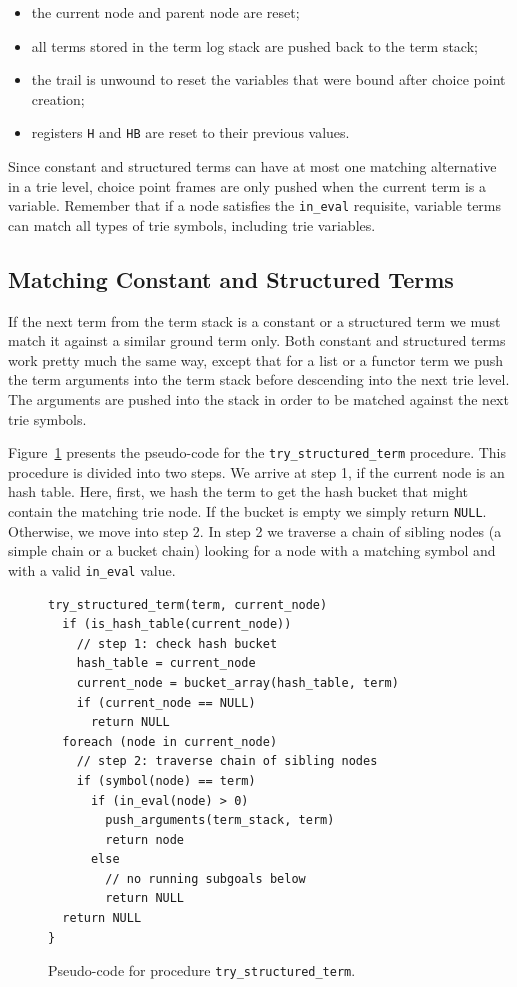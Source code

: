 \begin{itemize}
\item the current node and parent node are reset;
\item all terms stored in the term log stack are pushed back to the
  term stack;
\item the trail is unwound to reset the variables that were bound
  after choice point creation;
\item registers \texttt{H} and \texttt{HB} are reset to their previous values.
\end{itemize}

Since constant and structured terms can have at most one matching
alternative in a trie level, choice point frames are only pushed when
the current term is a variable. Remember that if a node satisfies the
\texttt{in\_eval} requisite, variable terms can match all types of trie
symbols, including trie variables.

\subsection{Matching Constant and Structured Terms}

If the next term from the term stack is a constant or a structured
term we must match it against a similar ground term only. Both
constant and structured terms work pretty much the same way, except
that for a list or a functor term we push the term arguments into the
term stack before descending into the next trie level. The arguments
are pushed into the stack in order to be matched against the next trie
symbols.

Figure~\ref{fig:try_structured_term} presents the pseudo-code for the
\texttt{try\_structured\_term} procedure. This procedure is divided into
two steps. We arrive at step 1, if the current node is an hash
table. Here, first, we hash the term to get the hash bucket that might
contain the matching trie node. If the bucket is empty we simply
return \texttt{NULL}. Otherwise, we move into step 2. In step 2 we traverse a
chain of sibling nodes (a simple chain or a bucket chain) looking for
a node with a matching symbol and with a valid \texttt{in\_eval} value.

\begin{figure}[ht]
\begin{Verbatim}
try_structured_term(term, current_node)
  if (is_hash_table(current_node))
    // step 1: check hash bucket
    hash_table = current_node
    current_node = bucket_array(hash_table, term)
    if (current_node == NULL)
      return NULL
  foreach (node in current_node)
    // step 2: traverse chain of sibling nodes
    if (symbol(node) == term)
      if (in_eval(node) > 0)
        push_arguments(term_stack, term)
        return node
      else
        // no running subgoals below
        return NULL
  return NULL
}
\end{Verbatim}
\caption{Pseudo-code for procedure \texttt{try\_structured\_term}.}
\label{fig:try_structured_term}
\end{figure}

